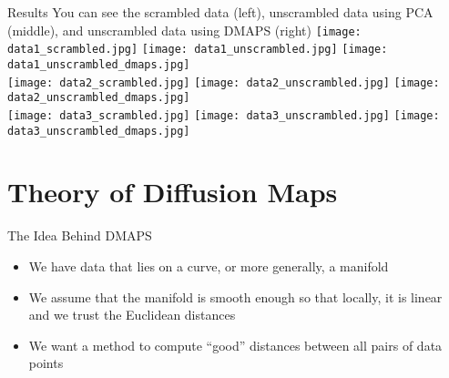 \documentclass{beamer}
\begin{document}
\begin{frame}{Results}
You can see the scrambled data (left), unscrambled data using PCA (middle), and unscrambled data using DMAPS (right)
    \centering
    \texttt{[image: data1\_scrambled.jpg]}
    \texttt{[image: data1\_unscrambled.jpg]}
    \texttt{[image: data1\_unscrambled\_dmaps.jpg]}\\
    \texttt{[image: data2\_scrambled.jpg]}
    \texttt{[image: data2\_unscrambled.jpg]}
    \texttt{[image: data2\_unscrambled\_dmaps.jpg]}\\
    \texttt{[image: data3\_scrambled.jpg]}
    \texttt{[image: data3\_unscrambled.jpg]}
    \texttt{[image: data3\_unscrambled\_dmaps.jpg]}

\end{frame}

\section{Theory of Diffusion Maps}

\begin{frame}{The Idea Behind DMAPS}
\begin{itemize}
\item We have data that lies on a curve, or more generally, a manifold
\item We assume that the manifold is smooth enough so that locally, it is linear and we trust the Euclidean distances
\item We want a method to compute ``good'' distances between all pairs of data points
\end{itemize}
\end{frame}
\end{document}

